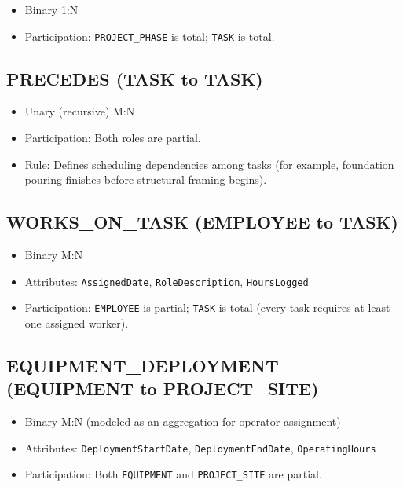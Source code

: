 \documentclass[a4paper,12pt]{report}
\providecommand{\tightlist}{%
  \setlength{\itemsep}{0pt}\setlength{\parskip}{0pt}}
\begin{document}
\begin{itemize}
\tightlist
\item
  Binary 1:N
\item
  Participation: \texttt{PROJECT\_\allowbreak{}PHASE} is total; \texttt{TASK} is total.
\end{itemize}

\subsection{PRECEDES (TASK to TASK)}\label{precedes-task-to-task}

\begin{itemize}
\tightlist
\item
  Unary (\allowbreak{}recursive) M:N
\item
  Participation: Both roles are partial.
\item
  Rule: Defines scheduling dependencies among tasks (\allowbreak{}for example, foundation pouring finishes before structural framing begins).
\end{itemize}

\subsection{\texorpdfstring{WORKS\texorpdfstring{\_\allowbreak{}}{_}ON\texorpdfstring{\_\allowbreak{}}{_}TASK (EMPLOYEE to TASK)}{WORKSONTASK (EMPLOYEE to TASK)}}\label{works_on_task-employee-to-task}

\begin{itemize}
\tightlist
\item
  Binary M:N
\item
  Attributes: \texttt{AssignedDate}, \texttt{RoleDescription}, \texttt{HoursLogged}
\item
  Participation: \texttt{EMPLOYEE} is partial; \texttt{TASK} is total (\allowbreak{}every task requires at least one assigned worker).
\end{itemize}

\subsection{\texorpdfstring{EQUIPMENT\texorpdfstring{\_\allowbreak{}}{_}DEPLOYMENT (EQUIPMENT to PROJECT\texorpdfstring{\_\allowbreak{}}{_}SITE)}{EQUIPMENTDEPLOYMENT (EQUIPMENT to PROJECTSITE)}}\label{equipment_deployment-equipment-to-project_site}

\begin{itemize}
\tightlist
\item
  Binary M:N (\allowbreak{}modeled as an aggregation for operator assignment)
\item
  Attributes: \texttt{DeploymentStartDate}, \texttt{DeploymentEndDate}, \texttt{OperatingHours}
\item
  Participation: Both \texttt{EQUIPMENT} and \texttt{PROJECT\_\allowbreak{}SITE} are partial.
\end{itemize}
\end{document}
